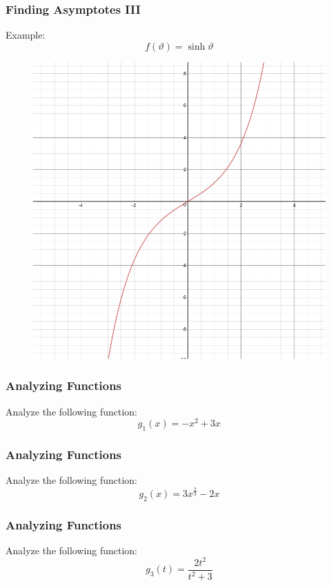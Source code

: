 \documentclass[xcolor=dvipsnames]{beamer}
\begin{document}
\begin{frame}
  \frametitle{Finding Asymptotes III}
Example:
\begin{equation}
  \label{eq:waduoqui}
  f(\vartheta)=\sinh\vartheta
\end{equation}
\begin{figure}[h]
\includegraphics[scale=.25]{./diagrams/asymp6.png}
\end{figure}
\end{frame}

\begin{frame}
  \frametitle{Analyzing Functions}
{\ubung} Analyze the following function:
\begin{equation}
  \label{eq:ohkaedoy}
g_{1}(x)=-x^{2}+3x
\end{equation}
\end{frame}

\begin{frame}
  \frametitle{Analyzing Functions}
{\ubung} Analyze the following function:
\begin{equation}
  \label{eq:teecakie}
g_{2}(x)=3x^{\frac{2}{3}}-2x
\end{equation}
\end{frame}

\begin{frame}
  \frametitle{Analyzing Functions}
{\ubung} Analyze the following function:
\begin{equation}
  \label{eq:saepaego}
g_{3}(t)=\frac{2t^{2}}{t^{2}+3}
\end{equation}
\end{frame}
\end{document}
